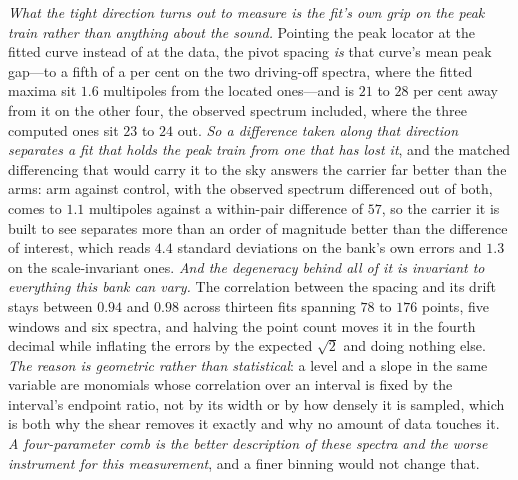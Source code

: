 \documentclass[11pt,a4paper]{article}
\theoremstyle{plain}
\theoremstyle{definition}
\theoremstyle{remark}
\begin{document}
\emph{What the tight direction turns out to measure is the fit's own grip on the peak train rather
than anything about the sound.} Pointing the peak locator at the fitted curve instead of at the data,
the pivot spacing \emph{is} that curve's mean peak gap---to a fifth of a per cent on the two
driving-off spectra, where the fitted maxima sit $1.6$ multipoles from the located ones---and is
$21$ to $28$ per cent away from it on the other four, the observed spectrum included, where the three computed ones sit
$23$ to $24$ out. \emph{So a difference taken along that direction separates a fit that holds the peak
train from one that has lost it}, and the matched differencing that would carry it to the sky answers the
carrier far better than the arms: arm against control, with the observed spectrum differenced out of both,
comes to $1.1$ multipoles against a within-pair difference of $57$, so the carrier it is built to see
separates more than an order of magnitude better than the difference of interest, which reads $4.4$ standard
deviations on the bank's own errors and $1.3$ on the scale-invariant ones. \emph{And the degeneracy behind all
of it is invariant to everything this bank can vary.} The correlation between the spacing and its
drift stays between $0.94$ and $0.98$ across thirteen fits spanning $78$ to $176$ points, five windows
and six spectra, and halving the point count moves it in the fourth decimal while inflating the errors
by the expected $\sqrt{2}$ and doing nothing else. \emph{The reason is geometric rather than
statistical}: a level and a slope in the same variable are monomials whose correlation over an
interval is fixed by the interval's endpoint ratio, not by its width or by how densely it is sampled,
which is both why the shear removes it exactly and why no amount of data touches
it. \emph{A four-parameter comb is the better description of
these spectra and the worse instrument for this measurement}, and a finer binning would not change
that.
\end{document}
